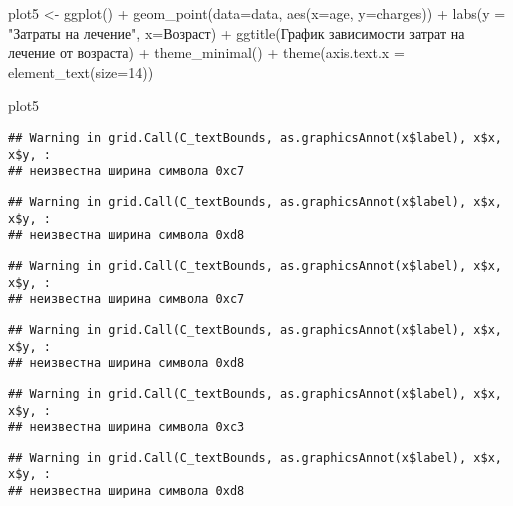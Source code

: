 \documentclass[
]{article}
\newenvironment{Shaded}{\begin{snugshade}}{\end{snugshade}}
\newcommand{\AttributeTok}[1]{\textcolor[rgb]{0.77,0.63,0.00}{#1}}
\newcommand{\DecValTok}[1]{\textcolor[rgb]{0.00,0.00,0.81}{#1}}
\newcommand{\FunctionTok}[1]{\textcolor[rgb]{0.00,0.00,0.00}{#1}}
\newcommand{\NormalTok}[1]{#1}
\newcommand{\OtherTok}[1]{\textcolor[rgb]{0.56,0.35,0.01}{#1}}
\newcommand{\SpecialCharTok}[1]{\textcolor[rgb]{0.00,0.00,0.00}{#1}}
\newcommand{\StringTok}[1]{\textcolor[rgb]{0.31,0.60,0.02}{#1}}
\begin{document}
\begin{Shaded}
\begin{Highlighting}[]
\NormalTok{plot5 }\OtherTok{\textless{}{-}} \FunctionTok{ggplot}\NormalTok{() }\SpecialCharTok{+}
  \FunctionTok{geom\_point}\NormalTok{(}\AttributeTok{data=}\NormalTok{data, }\FunctionTok{aes}\NormalTok{(}\AttributeTok{x=}\NormalTok{age, }\AttributeTok{y=}\NormalTok{charges)) }\SpecialCharTok{+}
  \FunctionTok{labs}\NormalTok{(}\AttributeTok{y =} \StringTok{"Затраты на лечение"}\NormalTok{, }\AttributeTok{x=}\StringTok{\textquotesingle{}Возраст\textquotesingle{}}\NormalTok{) }\SpecialCharTok{+}
  \FunctionTok{ggtitle}\NormalTok{(}\StringTok{\textquotesingle{}График зависимости затрат на лечение от возраста\textquotesingle{}}\NormalTok{) }\SpecialCharTok{+}
  \FunctionTok{theme\_minimal}\NormalTok{() }\SpecialCharTok{+}
  \FunctionTok{theme}\NormalTok{(}\AttributeTok{axis.text.x =} \FunctionTok{element\_text}\NormalTok{(}\AttributeTok{size=}\DecValTok{14}\NormalTok{))}

\NormalTok{plot5}
\end{Highlighting}
\end{Shaded}

\begin{verbatim}
## Warning in grid.Call(C_textBounds, as.graphicsAnnot(x$label), x$x, x$y, :
## неизвестна ширина символа 0xc7
\end{verbatim}

\begin{verbatim}
## Warning in grid.Call(C_textBounds, as.graphicsAnnot(x$label), x$x, x$y, :
## неизвестна ширина символа 0xd8
\end{verbatim}

\begin{verbatim}
## Warning in grid.Call(C_textBounds, as.graphicsAnnot(x$label), x$x, x$y, :
## неизвестна ширина символа 0xc7
\end{verbatim}

\begin{verbatim}
## Warning in grid.Call(C_textBounds, as.graphicsAnnot(x$label), x$x, x$y, :
## неизвестна ширина символа 0xd8
\end{verbatim}

\begin{verbatim}
## Warning in grid.Call(C_textBounds, as.graphicsAnnot(x$label), x$x, x$y, :
## неизвестна ширина символа 0xc3
\end{verbatim}

\begin{verbatim}
## Warning in grid.Call(C_textBounds, as.graphicsAnnot(x$label), x$x, x$y, :
## неизвестна ширина символа 0xd8
\end{verbatim}
\end{document}
